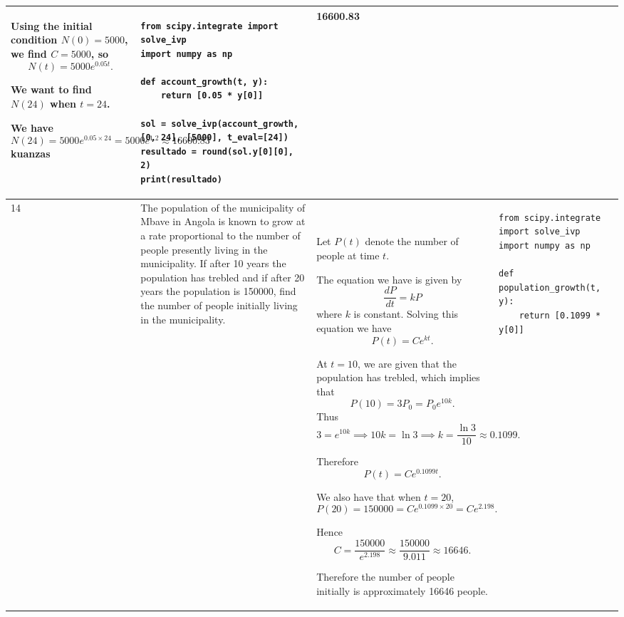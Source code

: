 \documentclass[a4paper,12pt]{article}
\begin{document}
\begin{longtable}{|p{0.3cm}|p{}|p{10cm}|p{}|p{1.5cm}|}
Using the initial condition \( N(0) = 5000 \), we find \( C = 5000 \), so
\[
N(t) = 5000 e^{0.05t}.
\]

We want to find \( N(24) \) when \( t = 24 \).

We have
\[
N(24) = 5000 e^{0.05 \times 24} = 5000 e^{1.2} \approx 16600.83 \] kuanzas


 






             &\begin{verbatim}
from scipy.integrate import solve_ivp
import numpy as np

def account_growth(t, y):
    return [0.05 * y[0]]

sol = solve_ivp(account_growth, [0, 24], [5000], t_eval=[24])
resultado = round(sol.y[0][0], 2)
print(resultado)\end{verbatim}&    16600.83              \\ \hline
     14            & The population of the municipality of Mbave in Angola is known to grow at a rate proportional to the number of people presently living in the municipality. If after 10 years the population has trebled and if after 20 years the population is 150000, find the number of people initially living in the municipality.
             & \


Let \( P(t) \) denote the number of people at time \( t \).

The equation we have is given by
\[
\frac{dP}{dt} = kP
\]
where \( k \) is constant. Solving this equation we have
\[
P(t) = C e^{kt}.
\]

At \( t = 10 \), we are given that the population has trebled, which implies that
\[
P(10) = 3P_0 = P_0 e^{10k}.
\]
Thus
\[
3 = e^{10k} \implies 10k = \ln 3 \implies k = \frac{\ln 3}{10} \approx 0.1099.
\]

Therefore
\[
P(t) = C e^{0.1099t}.
\]

We also have that when \( t = 20 \),
\[
P(20) = 150000 = C e^{0.1099 \times 20} = C e^{2.198}.
\]

Hence
\[
C = \frac{150000}{e^{2.198}} \approx \frac{150000}{9.011} \approx 16646.
\]

Therefore the number of people initially is approximately 16646 people.


              & \begin{verbatim}
from scipy.integrate import solve_ivp
import numpy as np

def population_growth(t, y):
    return [0.1099 * y[0]]


\end{verbatim}
\end{longtable}
\end{document}
